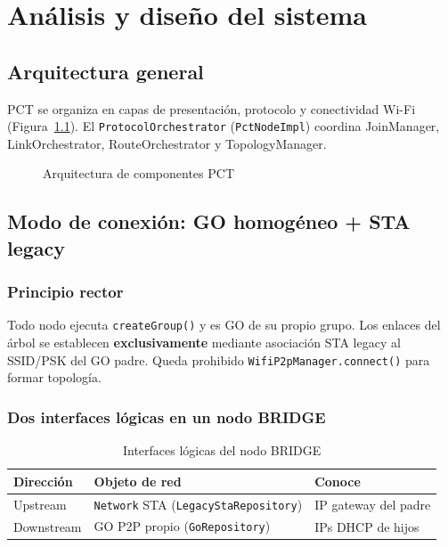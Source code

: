 \chapter{Análisis y diseño del sistema}
\label{cap:analisis-diseno}

\section{Arquitectura general}
\label{sec:arquitectura}

PCT se organiza en capas de presentación, protocolo y conectividad Wi-Fi (Figura~\ref{fig:arquitectura}). El \texttt{ProtocolOrchestrator} (\texttt{PctNodeImpl}) coordina JoinManager, LinkOrchestrator, RouteOrchestrator y TopologyManager.

\begin{figure}[htbp]
  \centering
  \caption{Arquitectura de componentes PCT}
  \label{fig:arquitectura}
\end{figure}

\section{Modo de conexión: GO homogéneo + STA legacy}
\label{sec:modo-conexion}

\subsection{Principio rector}

Todo nodo ejecuta \texttt{createGroup()} y es GO de su propio grupo. Los enlaces del árbol se establecen \textbf{exclusivamente} mediante asociación STA legacy al SSID/PSK del GO padre. Queda prohibido \texttt{WifiP2pManager.connect()} para formar topología.

\subsection{Dos interfaces lógicas en un nodo BRIDGE}

\begin{table}[htbp]
  \centering
  \caption{Interfaces lógicas del nodo BRIDGE}
  \label{tab:interfaces-bridge}
  \begin{tabular}{@{}lll@{}}
    \toprule
    \textbf{Dirección} & \textbf{Objeto de red} & \textbf{Conoce} \\
    \midrule
    Upstream   & \texttt{Network} STA (\texttt{LegacyStaRepository}) & IP gateway del padre \\
    Downstream & GO P2P propio (\texttt{GoRepository})               & IPs DHCP de hijos \\
    \bottomrule
  \end{tabular}
\end{table}


